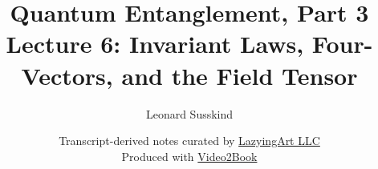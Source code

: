 \documentclass[11pt,oneside]{book}
\begin{document}
\hypersetup{pageanchor=false}
\frontmatter
\title{Quantum Entanglement, Part 3\\[0.45em]
\large Lecture 6: Invariant Laws, Four-Vectors, and the Field Tensor}
\author{Leonard Susskind}
\date{Transcript-derived notes curated by
\href{https://lazying.art}{LazyingArt LLC}\\[0.35em]
\small Produced with
\href{https://github.com/lachlanchen/Video2Book}{Video2Book}}
\maketitle
\hypersetup{pageanchor=true}
\mainmatter

\end{document}
